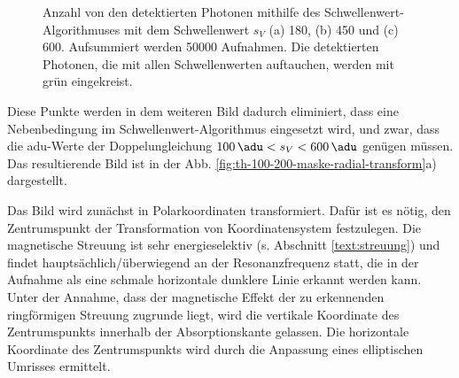 \begin{figure}[H]
    \centering
    
    \caption{Anzahl von den detektierten Photonen mithilfe des Schwellenwert-Algorithmuses mit dem Schwellenwert $s_V$ (a) \SI{180}{\adu}, (b) \SI{450}{\adu} und (c) \SI{600}{\adu}. Aufsummiert werden \num{50000} Aufnahmen. Die detektierten Photonen, die mit allen Schwellenwerten auftauchen, werden mit grün eingekreist.}
    \label{fig:th_180_450_600}
\end{figure}
\noindent
Diese Punkte werden in dem weiteren Bild dadurch eliminiert, dass eine Nebenbedingung im Schwellenwert-Algorithmus eingesetzt wird, und zwar, dass die \gls{adu}-Werte der Doppelungleichung $\SI{100}{\adu} < s_V < \SI{600}{\adu}$ genügen müssen. Das resultierende Bild ist in der Abb. \ref{fig:th-100-200-maske-radial-transform}a) dargestellt.

\noindent
Das Bild wird zunächst in Polarkoordinaten transformiert. Dafür ist es nötig, den Zentrumspunkt der Transformation von Koordinatensystem festzulegen. Die magnetische Streuung ist sehr energieselektiv (s. Abschnitt \ref{text:streuung}) und findet hauptsächlich/überwiegend an der Resonanzfrequenz statt, die in der Aufnahme als eine schmale horizontale dunklere Linie erkannt werden kann. Unter der Annahme, dass der magnetische Effekt der zu erkennenden ringförmigen Streuung zugrunde liegt, wird die vertikale Koordinate des Zentrumspunkts innerhalb der Absorptionskante gelassen. Die horizontale Koordinate des Zentrumspunkts wird durch die Anpassung eines elliptischen Umrisses ermittelt.

